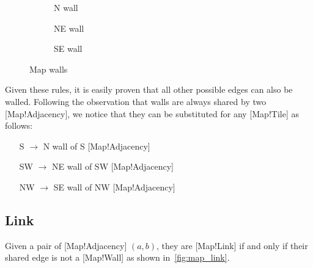 \begin{figure}[htbp]
    \centering
    \begin{subfigure}{0.3\textwidth}
        \centering
        \caption{N wall}
    \end{subfigure}
    \begin{subfigure}{0.3\textwidth}
        \centering
        \caption{NE wall}
    \end{subfigure}
    \begin{subfigure}{0.3\textwidth}
        \centering
        \caption{SE wall}
    \end{subfigure}
    \caption{Map walls}\label{fig:map_walls}
\end{figure}

Given these rules, it is easily proven that all other possible edges can also be walled.
Following the observation that walls are always shared by two [Map!Adjacency], we notice that they can be substituted for any [Map!Tile] as follows:

\begin{itemize}
    \item [S] {\(\rightarrow \) N wall of S [Map!Adjacency]}
    \item [SW] {\(\rightarrow \) NE wall of SW [Map!Adjacency]}
    \item [NW] {\(\rightarrow \) SE wall of NW [Map!Adjacency]}
\end{itemize}

\subsection{Link}

Given a pair of [Map!Adjacency] \((a,b)\), they are [Map!Link] if and only if their shared edge is not a [Map!Wall] as shown in~\ref{fig:map_link}.


